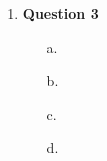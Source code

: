 \documentclass[11pt,letterpaper]{article}
\begin{document}
\begin{enumerate}
    \newpage

    \item {\bf Question 3 }\\
        \fbox{\parbox{\linewidth}{

        \begin{itemize}
            \item[a.]
            \item[b.]
            \item[c.]
            \item[d.]
        \end{itemize}
        }}

        \begin{solution}
        \begin{sol}
        \begin{itemize}
            \item[a.]
            \item[b.]
            \item[c.]
            \item[d.]
        \end{itemize}
        \end{sol}
        \end{solution}

\end{enumerate} 
\end{document}
